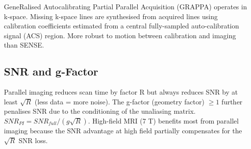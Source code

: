 				

GeneRalised Autocalibrating Partial Parallel Acquisition (GRAPPA) operates in k-space. Missing k-space lines are synthesised from acquired lines using calibration coefficients estimated from a central fully-sampled auto-calibration signal (ACS) region. More robust to motion between calibration and imaging than SENSE.

				

\subsection{SNR and g-Factor}

				

Parallel imaging reduces scan time by factor R but always reduces SNR by at least $\sqrt{R}$ (less data = more noise). The g-factor (geometry factor) $\geq 1$ further penalises SNR due to the conditioning of the unaliasing matrix. $SNR_{PI} = SNR_{full} / (g\sqrt{R})$. High-field MRI (7 T) benefits most from parallel imaging because the SNR advantage at high field partially compensates for the $\sqrt{R}$ SNR loss.



